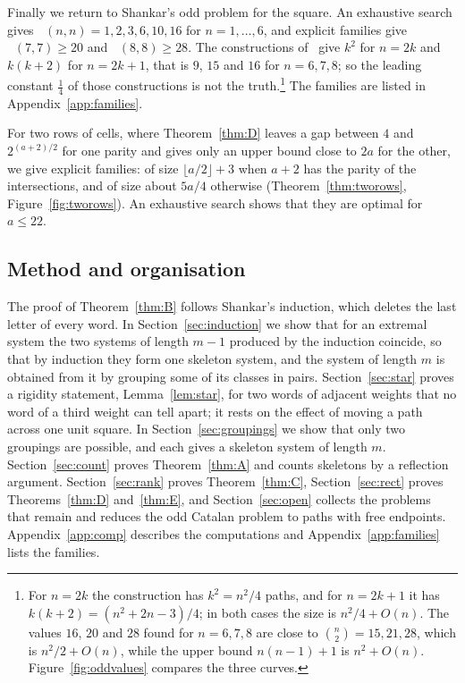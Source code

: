 \documentclass[11pt]{amsart}
\theoremstyle{definition}
\theoremstyle{remark}
\numberwithin{equation}{section}
\DeclareMathOperator{\Modd}{M_{od}}
\begin{document}
Finally we return to Shankar's odd problem for the square. An exhaustive search gives $\Modd(n,n)=1,2,3,6,10,16$ for $n=1,\dots,6$, and explicit families give $\Modd(7,7)\ge20$ and $\Modd(8,8)\ge28$. The constructions of~\cite{Sh} give $k^2$ for $n=2k$ and $k(k+2)$ for $n=2k+1$, that is $9$, $15$ and $16$ for $n=6,7,8$; so the leading constant $\tfrac14$ of those constructions is not the truth.\footnote{For $n=2k$ the construction has $k^2=n^2/4$ paths, and for $n=2k+1$ it has $k(k+2)=(n^2+2n-3)/4$; in both cases the size is $n^2/4+O(n)$. The values $16$, $20$ and $28$ found for $n=6,7,8$ are close to $\binom n2=15,21,28$, which is $n^2/2+O(n)$, while the upper bound $n(n-1)+1$ is $n^2+O(n)$. Figure~\ref{fig:oddvalues} compares the three curves.} The families are listed in Appendix~\ref{app:families}.

For two rows of cells, where Theorem~\ref{thm:D} leaves a gap between $4$ and $2^{(a+2)/2}$ for one parity and gives only an upper bound close to $2a$ for the other, we give explicit families: of size $\lfloor a/2\rfloor+3$ when $a+2$ has the parity of the intersections, and of size about $5a/4$ otherwise (Theorem~\ref{thm:tworows}, Figure~\ref{fig:tworows}). An exhaustive search shows that they are optimal for $a\le22$.

\subsection{Method and organisation}

The proof of Theorem~\ref{thm:B} follows Shankar's induction, which deletes the last letter of every word. In Section~\ref{sec:induction} we show that for an extremal system the two systems of length $m-1$ produced by the induction coincide, so that by induction they form one skeleton system, and the system of length $m$ is obtained from it by grouping some of its classes in pairs. Section~\ref{sec:star} proves a rigidity statement, Lemma~\ref{lem:star}, for two words of adjacent weights that no word of a third weight can tell apart; it rests on the effect of moving a path across one unit square. In Section~\ref{sec:groupings} we show that only two groupings are possible, and each gives a skeleton system of length $m$. Section~\ref{sec:count} proves Theorem~\ref{thm:A} and counts skeletons by a reflection argument. Section~\ref{sec:rank} proves Theorem~\ref{thm:C}, Section~\ref{sec:rect} proves Theorems~\ref{thm:D} and~\ref{thm:E}, and Section~\ref{sec:open} collects the problems that remain and reduces the odd Catalan problem to paths with free endpoints. Appendix~\ref{app:comp} describes the computations and Appendix~\ref{app:families} lists the families.
\end{document}
